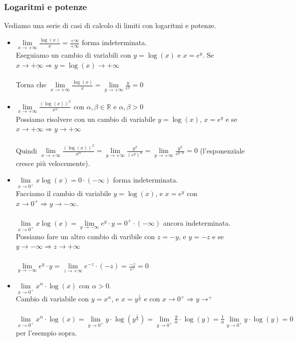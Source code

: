 \subsubsection{Logaritmi e potenze}
Vediamo una serie di casi di calcolo di limiti con logaritmi e potenze.
\begin{itemize}
    \item $\lim\limits_{x\to +\infty}\frac{\log(x)}{x} = \frac{+\infty}{+\infty}$ forma indeterminata.\\
    Eseguiamo un cambio di variabili con $y = \log(x)$ e $x = e^y$. Se $x\to +\infty \Longrightarrow y = \log(x) \to +\infty$\\\\
    Torna che $\lim\limits_{x \to +\infty}\frac{\log(x)}{x} = \lim\limits_{y\to +\infty}\frac{y}{e^y} = 0$
    \item $\lim\limits_{x\to +\infty}\frac{(\log(x))^\beta}{x^\alpha}$ con $\alpha, \beta \in \mathbb{R}$ e $\alpha, \beta > 0$\\
    Possiamo risolvere con un cambio di variabile $y = \log(x)$, $x = e^y$ e se $x \to +\infty \Longrightarrow y\to +\infty$\\\\
    Quindi $\lim\limits_{x\to +\infty}\frac{(\log(x))^\beta}{x^\alpha} = \lim\limits_{y \to +\infty}\frac{y^\beta}{(e^y)^\alpha} = \lim\limits_{y \to +\infty}\frac{y^\beta}{e^{y\cdot\alpha}} = 0$  (l'esponenziale cresce più velocemente).
    \item $\lim\limits_{x\to 0^+}x\log(x) = 0 \cdot (-\infty)$ forma indeterminata.\\
    Facciamo il cambio di variabile $y = \log(x)$, e $x = e^y$ con $x\to 0^+ \Longrightarrow y\to -\infty$.\\\\
    $\lim\limits_{x\to 0^+}x\log(x) = \lim\limits_{y\to -\infty}e^y \cdot y = 0^+ \cdot (-\infty)$ ancora indeterminata.\\
    Possiamo fare un altro cambio di varibile con $z = -y$, e $y = -z$ e se $y \to -\infty \Longrightarrow z \to +\infty$\\\\
    $\lim\limits_{y\to -\infty}e^y \cdot y = \lim\limits_{z\to +\infty}e^{-z} \cdot (-z) = \frac{-z}{e^z} = 0$
    \item $\lim\limits_{x\to 0^+}x^\alpha \cdot \log(x)$ con $\alpha > 0$.\\
    Cambio di variabile con $y = x^\alpha$, e $x = y^{\frac{1}{\alpha}}$ e con $x\to 0^+ \Longrightarrow y\to^+$\\\\
    $\lim\limits_{x\to 0^+}x^\alpha \cdot \log(x) = \lim\limits_{y\to 0^+}y \cdot \log(y^{\frac{1}{\alpha}}) = \lim\limits_{y\to 0^+}\frac{y}{\alpha} \cdot \log(y) = \frac{1}{\alpha}\lim\limits_{y\to 0^+} y \cdot \log(y) = 0$ per l'esempio sopra.
\end{itemize}

